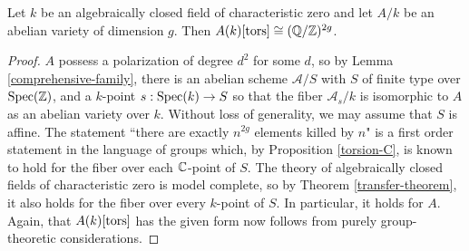 \begin{proposition}
Let $k$ be an algebraically closed field of characteristic zero and let $A/k$ be an abelian variety of dimension $g$. Then $A(k)[\operatorname{tors}]\cong (\mathbb{Q}/\mathbb{Z})^{2g}$.
\end{proposition}
\begin{proof}
\label{torsion-alg-closed-transfer}
$A$ possess a polarization of degree $d^2$ for some $d$, so by Lemma \ref{comprehensive-family}, there is an abelian scheme $\mathcal{A}/S$ with $S$ of finite type over $\operatorname{Spec}(\mathbb{Z})$, and a $k$-point $s:\operatorname{Spec}(k)\rightarrow S$ so that the fiber $\mathcal{A}_s/k$ is isomorphic to $A$ as an abelian variety over $k$. Without loss of generality, we may assume that $S$ is affine. The statement ``there are exactly $n^{2g}$ elements killed by $n$" is a first order statement in the language of groups which, by Proposition \ref{torsion-C}, is known to hold for the fiber over each $\mathbb{C}$-point of $S$. The theory of algebraically closed fields of characteristic zero is model complete, so by Theorem \ref{transfer-theorem}, it also holds for the fiber over every $k$-point of $S$. In particular, it holds for $A$. Again, that $A(k)[\operatorname{tors}]$ has the given form now follows from purely group-theoretic considerations.
\end{proof}